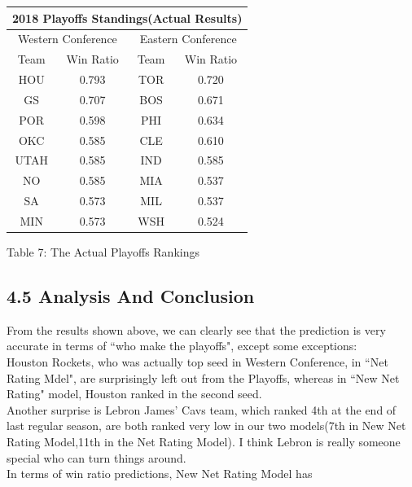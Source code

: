 \documentclass[11pt]{article}
\begin{document}
\begin{center}
\begin{tabular}{|c|c|c|c|}
\hline
\multicolumn{4}{|c|}{2018 Playoffs Standings(Actual Results)}\\
\hline
\multicolumn{2}{|c|}{Western Conference} &
\multicolumn{2}{c|}{Eastern Conference} \\
\hline
Team& Win Ratio & Team & Win Ratio \\
\hline
HOU  & 0.793 & TOR & 0.720\\
\hline
GS   & 0.707 & BOS & 0.671\\
\hline
POR  & 0.598 & PHI & 0.634\\
\hline
OKC  & 0.585 & CLE & 0.610\\
\hline
UTAH & 0.585 & IND & 0.585\\
\hline
NO   & 0.585 & MIA & 0.537\\
\hline
SA   & 0.573 & MIL & 0.537\\
\hline
MIN  & 0.573 & WSH & 0.524\\
\hline
\end{tabular}
\bigskip

Table 7: The Actual Playoffs Rankings
\end{center}

\newpage
\subsection*{4.5 Analysis And Conclusion}

From the results shown above, we can clearly see that the prediction is very accurate in terms of ``who make the playoffs", except some exceptions:\\
Houston Rockets, who was actually top seed in Western Conference, in ``Net Rating Mdel", are surprisingly left out from the Playoffs, whereas in ``New Net Rating" model, Houston ranked in the second seed.\\
Another surprise is Lebron James' Cavs team, which ranked 4th at the end of last regular season, are both ranked very low in our two models(7th in New Net Rating Model,11th in the Net Rating Model). I think Lebron is really someone special who can turn things around.\\

In terms of win ratio predictions, New Net Rating Model has 
\end{document}
